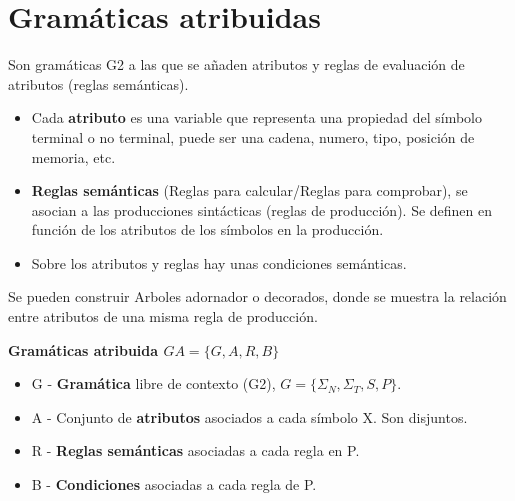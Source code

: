 \documentclass[12pt]{report} %
\begin{document}
\section{Gramáticas atribuidas}
Son gramáticas G2 a las que se añaden atributos y reglas de evaluación de atributos (reglas semánticas).
\begin{itemize}
  \item Cada \textbf{atributo} es una variable que representa una propiedad del símbolo terminal o no terminal, puede ser una cadena, numero, tipo, posición de memoria, etc.
  \item \textbf{Reglas semánticas} (Reglas para calcular/Reglas para comprobar), se asocian a las producciones sintácticas (reglas de producción). Se definen en función de los atributos de los símbolos en la producción.
  \item Sobre los atributos y reglas hay unas condiciones semánticas.
\end{itemize}

Se pueden construir Arboles adornador o decorados, donde se muestra la relación entre atributos de una misma regla de producción.

\textbf{Gramáticas atribuida $GA=\{G,A,R,B\}$}
\begin{itemize}
  \item G - \textbf{Gramática} libre de contexto (G2), $G = \{\Sigma_N, \Sigma_T, S, P\}$.
  \item A - Conjunto de \textbf{atributos} asociados a cada símbolo X. Son disjuntos.
  \item R - \textbf{Reglas semánticas} asociadas a cada regla en P.
  \item B - \textbf{Condiciones} asociadas a cada regla de P.
\end{itemize}
\end{document}
